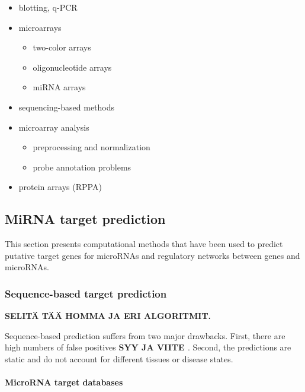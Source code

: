 \begin{itemize}
  \item blotting, q-PCR
  \item microarrays
  \begin{itemize}
    \item two-color arrays
    \item oligonucleotide arrays
    \item miRNA arrays
  \end{itemize}
  \item sequencing-based methods
  \item microarray analysis
  \begin{itemize}
    \item preprocessing and normalization
    \item probe annotation problems
  \end{itemize}
  \item protein arrays (RPPA)
\end{itemize}









\subsection{MiRNA target prediction}\label{mirna-target-prediction}

This section presents computational methods that have been used to predict
putative target genes for microRNAs and regulatory networks between genes and
microRNAs.





\subsubsection{Sequence-based target prediction}\label{sequence-based-target-
prediction}

\textbf{SELITÄ TÄÄ HOMMA JA ERI ALGORITMIT.}

Sequence-based prediction suffers from two major drawbacks. First, there are
high numbers of false positives \textbf{SYY JA VIITE
\citep{Sethupathy2006?}}. Second, the predictions are static and do not
account for different tissues or disease states.


\paragraph{MicroRNA target databases}





